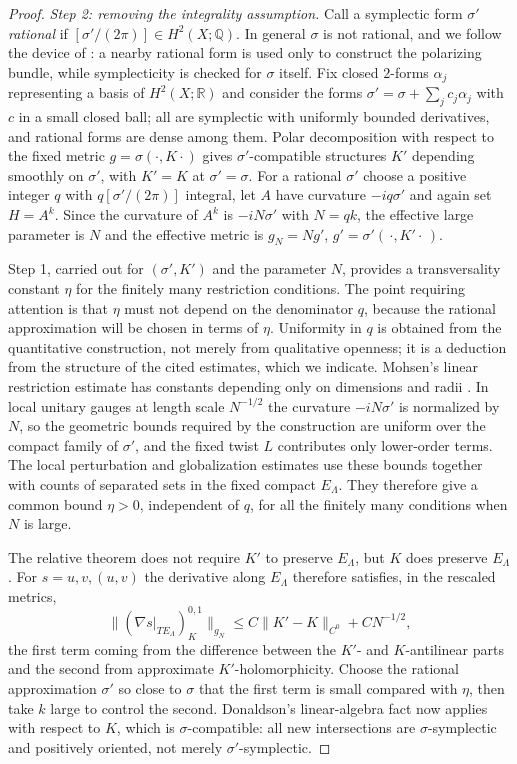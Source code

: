 \documentclass[11pt]{article}
\theoremstyle{remark}
\newcommand{\R}{\mathbb R}
\begin{document}
\begin{proof}
\emph{Step 2: removing the integrality assumption.} Call a symplectic
form $\sigma'$ \emph{rational} if $[\sigma'/(2\pi)]\in H^2(X;\mathbb Q)$.
In general $\sigma$ is not rational, and we follow the
device of \cite[Section 1]{Auroux2001b}: a nearby rational form is used
only to construct the polarizing bundle, while symplecticity is checked
for $\sigma$ itself. Fix closed $2$-forms $\alpha_j$ representing a
basis of $H^2(X;\R)$ and consider the forms
$\sigma'=\sigma+\sum_jc_j\alpha_j$ with $c$ in a small closed ball; all
are symplectic with uniformly bounded derivatives, and rational forms
are dense among them. Polar decomposition with respect to the fixed
metric $g=\sigma(\cdot,K\cdot)$ gives
$\sigma'$-compatible structures $K'$ depending smoothly on $\sigma'$,
with $K'=K$ at $\sigma'=\sigma$. For a rational $\sigma'$ choose a
positive integer $q$ with $q[\sigma'/(2\pi)]$ integral, let $A$ have
curvature $-iq\sigma'$ and again set $H=A^k$. Since the curvature of
$A^k$ is $-iN\sigma'$ with $N=qk$, the effective large parameter is
$N$ and the effective metric is $g_N=Ng'$, $g'=\sigma'(\,\cdot,K'\cdot\,)$.

Step 1, carried out for $(\sigma',K')$ and the parameter $N$, provides
a transversality constant $\eta$ for the finitely many restriction
conditions. The point requiring attention is that $\eta$ must not
depend on the denominator $q$, because the rational approximation will
be chosen in terms of $\eta$. Uniformity in $q$ is obtained from the
quantitative construction, not merely from qualitative openness; it is
a deduction from the structure of the cited estimates, which we
indicate. Mohsen's linear restriction estimate has constants depending
only on dimensions and radii
\cite[Theorem 6.5 and Corollary 6.6]{Mohsen2019}. In local unitary
gauges at length scale $N^{-1/2}$ the curvature $-iN\sigma'$ is
normalized by $N$, so the geometric bounds required by the construction
are uniform over the compact family of $\sigma'$, and the fixed twist
$L$ contributes only lower-order terms. The local perturbation and
globalization estimates
\cite[Proposition 8.2 and Sections 8.3--8.6]{Mohsen2019} use these
bounds together with counts of separated sets in the fixed compact
$E_\Lambda$. They therefore give a common bound $\eta>0$, independent
of $q$, for all the finitely many conditions when $N$ is large.

The relative theorem does not require $K'$ to preserve $E_\Lambda$, but
$K$ does preserve $E_\Lambda$. For $s=u,v,(u,v)$ the derivative along
$E_\Lambda$ therefore satisfies, in the rescaled metrics,
\[
 \bigl\|(\nabla s|_{TE_\Lambda})^{0,1}_K\bigr\|_{g_N}
 \le C\lVert K'-K\rVert_{C^0}+CN^{-1/2},
\]
the first term coming from the difference between the $K'$- and
$K$-antilinear parts and the second from approximate
$K'$-holomorphicity. Choose the rational approximation $\sigma'$ so
close to $\sigma$ that the first term is small compared with $\eta$,
then take $k$ large to control the second. Donaldson's linear-algebra
fact now applies with respect to $K$, which is $\sigma$-compatible: all
new intersections are $\sigma$-symplectic and positively oriented, not
merely $\sigma'$-symplectic.


\end{proof}
\end{document}
